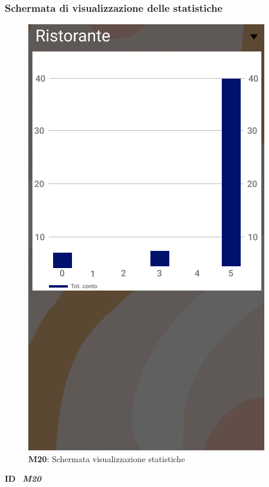                     \subsubsection{Schermata di visualizzazione delle statistiche}
                      \begin{figure}[H]
                        \centering
                        \includegraphics[scale=0.5]{assets/Mockup/Mockup_Statistics.png}
                        \caption*{\textbf{M20}: Schermata visualizzazione statistiche}\label{fig:Mockup_Statistics}
                      \end{figure}

                      \begin{flushleft}
                        \textbf{ID}   \ \Large{\textit{\textbf{M20}}}
                      \end{flushleft}

